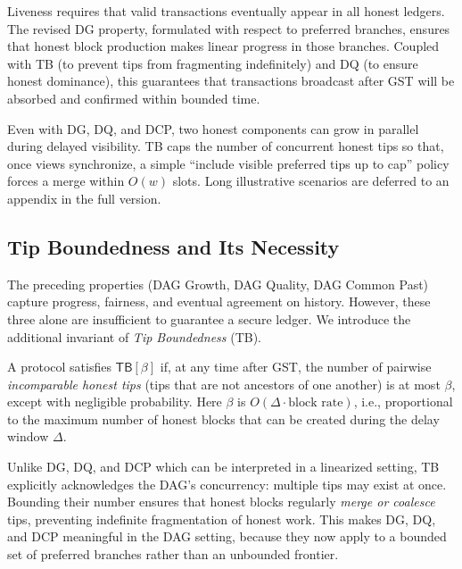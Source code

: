 \begin{remark}
Liveness requires that valid transactions eventually appear in all honest ledgers. 
The revised DG property, formulated with respect to preferred branches, 
ensures that honest block production makes linear progress in those branches. 
Coupled with TB (to prevent tips from fragmenting indefinitely) 
and DQ (to ensure honest dominance), this guarantees that transactions 
broadcast after GST will be absorbed and confirmed within bounded time. 
\end{remark}







\begin{remark}
Even with DG, DQ, and DCP, two honest components can grow in parallel during delayed visibility. 
TB caps the number of concurrent honest tips so that, once views synchronize, a simple ``include visible preferred tips up to cap'' policy forces a merge within $O(w)$ slots.
Long illustrative scenarios are deferred to an appendix in the full version.
\end{remark}


\subsection{Tip Boundedness and Its Necessity}%
\label{subsec:tip-boundedness}

The preceding properties (DAG Growth, DAG Quality, DAG Common Past) capture
progress, fairness, and eventual agreement on history. However, these three
alone are insufficient to guarantee a secure ledger. We introduce the additional
invariant of \emph{Tip Boundedness} (TB).

\begin{definition}
A protocol satisfies $\mathsf{TB}[\beta]$ if, at any time after GST, the number
of pairwise \emph{incomparable honest tips} (tips that are not ancestors of one
another) is at most $\beta$, except with negligible probability. Here $\beta$ is
$O(\Delta \cdot \text{block rate})$, i.e., proportional to the maximum number of
honest blocks that can be created during the delay window $\Delta$.
\end{definition}

\begin{remark}
Unlike DG, DQ, and DCP which can be interpreted in a linearized setting,
TB explicitly acknowledges the DAG’s concurrency: multiple tips may
exist at once. Bounding their number ensures that honest blocks regularly
\emph{merge or coalesce} tips, preventing indefinite fragmentation of honest
work. This makes DG, DQ, and DCP meaningful in the DAG setting, because they
now apply to a bounded set of preferred branches rather than an unbounded
frontier.
\end{remark}

